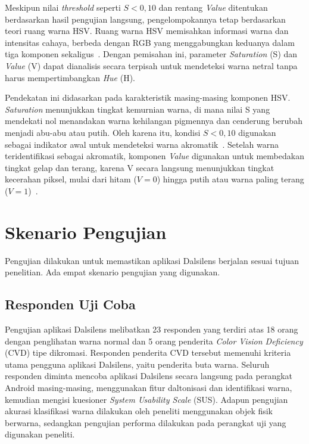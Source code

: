 Meskipun nilai \textit{threshold} seperti $S < 0{,}10$ dan rentang \textit{Value} ditentukan berdasarkan hasil pengujian langsung, pengelompokannya tetap berdasarkan teori ruang warna HSV\@.
Ruang warna HSV memisahkan informasi warna dan intensitas cahaya, berbeda dengan RGB yang menggabungkan keduanya dalam tiga komponen sekaligus~\parencite{tasnim2017}.
Dengan pemisahan ini, parameter \textit{Saturation} (S) dan \textit{Value} (V) dapat dianalisis secara terpisah untuk mendeteksi warna netral tanpa harus mempertimbangkan \textit{Hue} (H).

Pendekatan ini didasarkan pada karakteristik masing-masing komponen HSV.
\textit{Saturation} menunjukkan tingkat kemurnian warna, di mana nilai S yang mendekati nol menandakan warna kehilangan pigmennya dan cenderung berubah menjadi abu-abu atau putih.
Oleh karena itu, kondisi $S < 0{,}10$ digunakan sebagai indikator awal untuk mendeteksi warna akromatik~\parencite{Sirisathitkul31122025}.
Setelah warna teridentifikasi sebagai akromatik, komponen \textit{Value} digunakan untuk membedakan tingkat gelap dan terang, karena V secara langsung menunjukkan tingkat kecerahan piksel, mulai dari hitam ($V = 0$) hingga putih atau warna paling terang ($V = 1$)~\parencite{Sirisathitkul31122025}.

\section{Skenario Pengujian}

Pengujian dilakukan untuk memastikan aplikasi Dalsilens berjalan sesuai tujuan penelitian.
Ada empat skenario pengujian yang digunakan.

\subsection{Responden Uji Coba}

Pengujian aplikasi Dalsilens melibatkan 23 responden yang terdiri atas 18 orang dengan penglihatan warna normal dan 5 orang penderita \textit{Color Vision Deficiency} (CVD) tipe dikromasi.
Responden penderita CVD tersebut memenuhi kriteria utama pengguna aplikasi Dalsilens, yaitu penderita buta warna.
Seluruh responden diminta mencoba aplikasi Dalsilens secara langsung pada perangkat Android masing-masing, menggunakan fitur daltonisasi dan identifikasi warna, kemudian mengisi kuesioner \textit{System Usability Scale} (SUS).
Adapun pengujian akurasi klasifikasi warna dilakukan oleh peneliti menggunakan objek fisik berwarna, sedangkan pengujian performa dilakukan pada perangkat uji yang digunakan peneliti.


